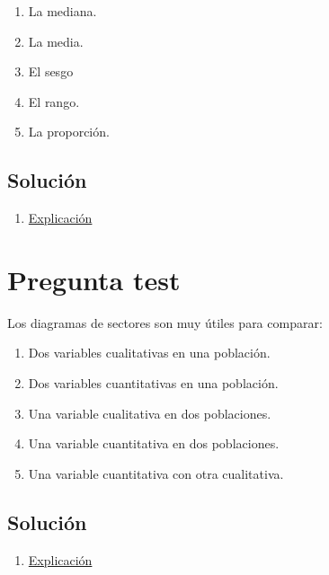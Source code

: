 \documentclass[
]{book}
\providecommand{\tightlist}{%
  \setlength{\itemsep}{0pt}\setlength{\parskip}{0pt}}
\begin{document}
\begin{enumerate}
\def\labelenumi{\alph{enumi})}
\tightlist
\item
  La mediana.
\item
  La media.
\item
  El sesgo
\item
  El rango.
\item
  La proporción.
\end{enumerate}

\hypertarget{soluciuxf3n-19}{%
\subsection{Solución}\label{soluciuxf3n-19}}

\begin{enumerate}
\def\labelenumi{\alph{enumi})}
\tightlist
\item
  \href{https://1fjmanzano.github.io/bioestadistica/medidas-de-posicio\%CC\%81n-dispersio\%CC\%81n-y-forma.html\#medidas-de-posicio\%CC\%81n-centrales}{Explicación}
\end{enumerate}

\hypertarget{pregunta-test-18}{%
\section{Pregunta test}\label{pregunta-test-18}}

Los diagramas de sectores son muy útiles para comparar:

\begin{enumerate}
\def\labelenumi{\alph{enumi})}
\tightlist
\item
  Dos variables cualitativas en una población.
\item
  Dos variables cuantitativas en una población.
\item
  Una variable cualitativa en dos poblaciones.
\item
  Una variable cuantitativa en dos poblaciones.
\item
  Una variable cuantitativa con otra cualitativa.
\end{enumerate}

\hypertarget{soluciuxf3n-20}{%
\subsection{Solución}\label{soluciuxf3n-20}}

\begin{enumerate}
\def\labelenumi{\alph{enumi})}
\setcounter{enumi}{2}
\tightlist
\item
  \href{https://1fjmanzano.github.io/bioestadistica/diagramas-de-barras-y-sectores.html}{Explicación}
\end{enumerate}
\end{document}
